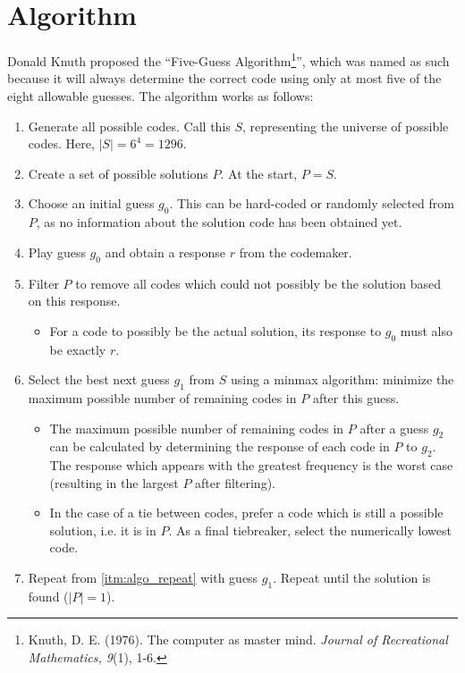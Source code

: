 \documentclass{article}
\begin{document}
\section{Algorithm}
\label{sec:algorithm}
Donald Knuth proposed the ``Five-Guess Algorithm\footnote{Knuth, D. E. (1976). The computer as master mind. \textit{Journal of Recreational Mathematics, 9}(1), 1-6.}'', which was named as such because it will always determine the correct code using only at most five of the eight allowable guesses. The algorithm works as follows:
\begin{enumerate}[label=\textbf{S.\arabic*}]
	\item Generate all possible codes. Call this $S$, representing the universe of possible codes. Here, $|S| = 6^4 = 1296$.
	\item Create a set of possible solutions $P$. At the start, $P=S$.
	\item Choose an initial guess $g_0$. This can be hard-coded or randomly selected from $P$, as no information about the solution code has been obtained yet.
	\item \label{itm:algo_repeat} Play guess $g_0$ and obtain a response $r$ from the codemaker.
	\item \label{itm:algo_filter} Filter $P$ to remove all codes which could not possibly be the solution based on this response.
		\begin{itemize}
		\item For a code to possibly be the actual solution, its response to $g_0$ must also be exactly $r$.
		\end{itemize}
	\item Select the best next guess $g_1$ from $S$ using a minmax algorithm: minimize the maximum possible number of remaining codes in $P$ after this guess.
		\begin{itemize}
		\item The maximum possible number of remaining codes in $P$ after a guess $g_2$ can be calculated by determining the response of each code in $P$ to $g_2$. The response which appears with the greatest frequency is the worst case (resulting in the largest $P$ after filtering).
		\item In the case of a tie between codes, prefer a code which is still a possible solution, i.e. it is in $P$. As a final tiebreaker, select the numerically lowest code.
		\end{itemize}
	\item Repeat from \autoref{itm:algo_repeat} with guess $g_1$. Repeat until the solution is found ($|P|=1$).
\end{enumerate}
\end{document}
